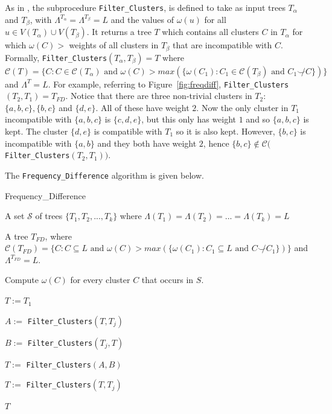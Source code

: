 \documentclass{article}
\newcommand{\compatible}{\smile}
\newcommand{\leafset}{\Lambda}
\newcommand{\weight}{\omega}
\newcommand{\TA}{T_\alpha}
\newcommand{\TB}{T_\beta}
\begin{document}
    As in \cite{jansson2018algorithms}, the subprocedure \texttt{Filter\_Clusters}, is defined to take as input trees $\TA$ and $\TB$, with $\leafset^{\TA} = \leafset^{\TB} = L$ and the values of $\weight(u)$ for all $u \in V(\TA) \cup V(\TB)$. It returns a tree $T$ which contains all clusters $C$ in $\TA$ for which $\weight(C) > $ weights of all clusters in $\TB$ that are incompatible with $C$. Formally, \texttt{Filter\_Clusters}$(\TA, \TB) = T$ where $\mathcal{C}(T) = \{C : C \in \mathcal{C}(\TA) \text{ and } \weight(C) > max(\{\weight(C_1) : C_1 \in \mathcal{C}(\TB) \text{ and } C_1 \not\compatible C\})\}$ and $\leafset^T = L$. For example, referring to Figure~\ref{fig:freqdiff}, \texttt{Filter\_Clusters}$(T_2, T_1) = T_{FD}$. Notice that there are three non-trivial clusters in $T_2$: $\{a, b, c\}, \{b, c\}$ and $\{d, e\}$. All of these have weight $2$. Now the only cluster in $T_1$ incompatible with $\{a, b, c\}$ is $\{c, d, e\}$, but this only has weight $1$ and so $\{a, b, c\}$ is kept. The cluster $\{d, e\}$ is compatible with $T_1$ so it is also kept. However, $\{b, c\}$ is incompatible with $\{a, b\}$ and they both have weight $2$, hence $\{b, c\} \not\in \mathcal{C}($\texttt{Filter\_Clusters}$(T_2, T_1))$.

    The \texttt{Frequency\_Difference} algorithm is given below.

    \begin{algorithm}
        \caption{Frequency\_Difference}
        \label{alg:frequencydifference}

        \begin{algorithmic}[1]
            \Input A set $\mathcal{S}$ of trees $\{T_1, T_2, ..., T_k\}$ where $\leafset(T_1) = \leafset(T_2) = ... = \leafset(T_k) = L$

            \Output A tree $T_{FD}$, where $\mathcal{C}(T_{FD}) = \{C : C \subseteq L \text{ and } \weight(C) > max(\{\weight(C_1) : C_1 \subseteq L \text{ and } C \not\compatible C_1\})\}$ and $\leafset^{T_{FD}} = L$.

            \State Compute $\weight(C)$ for every cluster $C$ that occurs in $S$.

            \State $T := T_1$

                \State $A :=$ \texttt{Filter\_Clusters}$(T, T_j)$

                \State $B :=$ \texttt{Filter\_Clusters}$(T_j, T)$

                \State $T :=$ \texttt{Filter\_Clusters}$(A, B)$
            \EndFor

                \State $T :=$ \texttt{Filter\_Clusters}$(T, T_j)$
            \EndFor

            \State \Return $T$
        \end{algorithmic}
    \end{algorithm}
\end{document}

